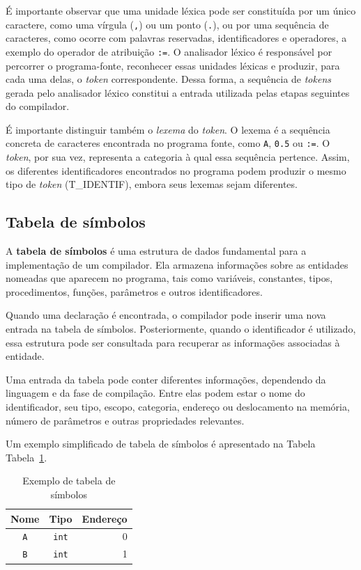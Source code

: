 \documentclass[
  brazilian,
  letterpaper,
]{book}
\theoremstyle{plain}
\theoremstyle{definition}
\theoremstyle{remark}
\begin{document}
É importante observar que uma unidade léxica pode ser constituída por um
único caractere, como uma vírgula (\texttt{,}) ou um ponto (\texttt{.}),
ou por uma sequência de caracteres, como ocorre com palavras reservadas,
identificadores e operadores, a exemplo do operador de atribuição
\texttt{:=}. O analisador léxico é responsável por percorrer o
programa-fonte, reconhecer essas unidades léxicas e produzir, para cada
uma delas, o \emph{token} correspondente. Dessa forma, a sequência de
\emph{tokens} gerada pelo analisador léxico constitui a entrada
utilizada pelas etapas seguintes do compilador.

É importante distinguir também o \emph{lexema} do \emph{token}. O lexema
é a sequência concreta de caracteres encontrada no programa fonte, como
\texttt{A}, \texttt{0.5} ou \texttt{:=}. O \emph{token}, por sua vez,
representa a categoria à qual essa sequência pertence. Assim, os
diferentes identificadores encontrados no programa podem produzir o
mesmo tipo de \emph{token} (T\_IDENTIF), embora seus lexemas sejam
diferentes.

\subsection{Tabela de símbolos}\label{tabela-de-suxedmbolos}

A \textbf{tabela de símbolos} é uma estrutura de dados fundamental para
a implementação de um compilador. Ela armazena informações sobre as
entidades nomeadas que aparecem no programa, tais como variáveis,
constantes, tipos, procedimentos, funções, parâmetros e outros
identificadores.

Quando uma declaração é encontrada, o compilador pode inserir uma nova
entrada na tabela de símbolos. Posteriormente, quando o identificador é
utilizado, essa estrutura pode ser consultada para recuperar as
informações associadas à entidade.

Uma entrada da tabela pode conter diferentes informações, dependendo da
linguagem e da fase de compilação. Entre elas podem estar o nome do
identificador, seu tipo, escopo, categoria, endereço ou deslocamento na
memória, número de parâmetros e outras propriedades relevantes.

Um exemplo simplificado de tabela de símbolos é apresentado na Tabela
Tabela~\ref{tbl-simbolos}.

\begin{longtable}[]{|c|c|r|}

\caption{\label{tbl-simbolos}Exemplo de tabela de símbolos}

\tabularnewline

\toprule\noalign{}
Nome & Tipo & Endereço \\
\midrule\noalign{}
\endhead
\bottomrule\noalign{}
\endlastfoot
\texttt{A} & \texttt{int} & 0 \\
\midrule
\texttt{B} & \texttt{int} & 1 \\

\end{longtable}
\end{document}
